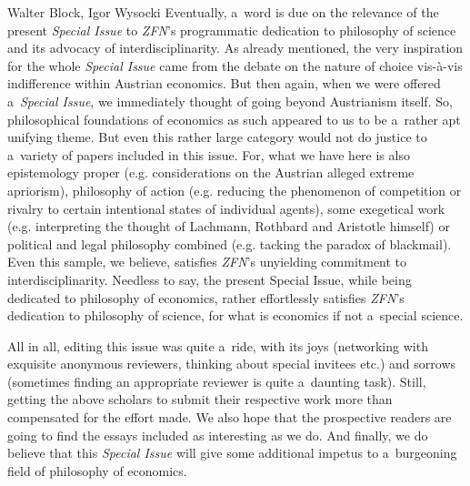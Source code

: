 \begin{editorialeng}{Walter Block, Igor Wysocki}
Eventually, a~word is due on the relevance of the present \textit{Special Issue} to \textit{ZFN}'s programmatic dedication to philosophy of science and its advocacy of interdisciplinarity. As already mentioned, the very inspiration for the whole \textit{Special Issue} came from the debate on the nature of choice vis-à-vis indifference within Austrian economics. But then again, when we were offered a~\textit{Special Issue}, we immediately thought of going beyond Austrianism itself. So, philosophical foundations of economics as such appeared to us to be a~rather apt unifying theme. But even this rather large category would not do justice to a~variety of papers included in this issue. For, what we have here is also epistemology proper (e.g. considerations on the Austrian alleged extreme apriorism), philosophy of action (e.g. reducing the phenomenon of competition or rivalry to certain intentional states of individual agents), some exegetical work (e.g. interpreting the thought of Lachmann, Rothbard and Aristotle himself) or political and legal philosophy combined (e.g. tacking the paradox of blackmail). Even this sample, we believe, satisfies \textit{ZFN}'s unyielding commitment to interdisciplinarity. Needless to say, the present Special Issue, while being dedicated to philosophy of economics, rather effortlessly satisfies \textit{ZFN}'s dedication to philosophy of science, for what is economics if not a~special science.



All in all, editing this issue was quite a~ride, with its joys (networking with exquisite anonymous reviewers, thinking about special invitees etc.) and sorrows (sometimes finding an appropriate reviewer is quite a~daunting task). Still, getting the above scholars to submit their respective work more than compensated for the effort made. We also hope that the prospective readers are going to find the essays included as interesting as we do. And finally, we do believe that this \textit{Special Issue} will give some additional impetus to a~burgeoning field of philosophy of economics.









\end{editorialeng}

